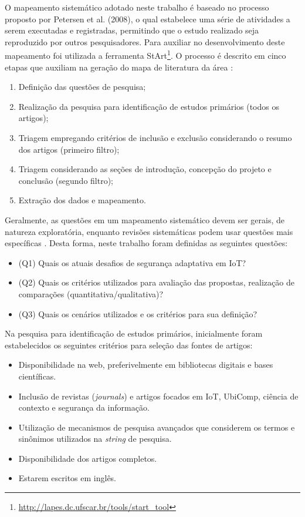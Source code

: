 \documentclass[tid,table]{texufpel} %
\begin{document}
O mapeamento sistemático adotado neste trabalho é baseado no processo proposto por Petersen et al. (2008), o qual estabelece uma série de atividades a serem executadas e registradas, permitindo que o estudo realizado seja reproduzido por outros pesquisadores. Para auxiliar no desenvolvimento deste mapeamento foi utilizada a ferramenta StArt\footnote{\url{http://lapes.dc.ufscar.br/tools/start_tool}}. O processo é descrito em cinco etapas que auxiliam na geração do mapa de literatura da área \cite{petersen08}:

\begin{enumerate}
\item Definição das questões de pesquisa;
\item Realização da pesquisa para identificação de estudos primários (todos os artigos);
\item Triagem empregando critérios de inclusão e exclusão considerando o resumo dos artigos (primeiro filtro);
\item Triagem considerando as seções de introdução, concepção do projeto e conclusão (segundo filtro);
\item Extração dos dados e mapeamento.
\end{enumerate}

Geralmente, as questões em um mapeamento sistemático devem ser gerais, de natureza exploratória, enquanto revisões sistemáticas podem usar questões mais específicas \cite{petersen15}. Desta forma, neste trabalho foram definidas as seguintes questões:

\begin{itemize}
\item (Q1) Quais os atuais desafios de segurança adaptativa em IoT?
\item (Q2) Quais os critérios utilizados para avaliação das propostas, realização de comparações (quantitativa/qualitativa)?
\item (Q3) Quais os cenários utilizados e os critérios para sua definição?
\end{itemize}

Na pesquisa para identificação de estudos primários, inicialmente foram estabelecidos os seguintes critérios para seleção das fontes de artigos:

\begin{itemize}
\item Disponibilidade na web, preferivelmente em bibliotecas digitais e bases científicas.
\item Inclusão de revistas (\textit{journals}) e artigos focados em IoT, UbiComp, ciência de contexto e segurança da informação.
\item Utilização de mecanismos de pesquisa avançados que considerem os termos e sinônimos utilizados na \textit{string} de pesquisa.
\item Disponibilidade dos artigos completos.
\item Estarem escritos em inglês.
\end{itemize}
\end{document}
